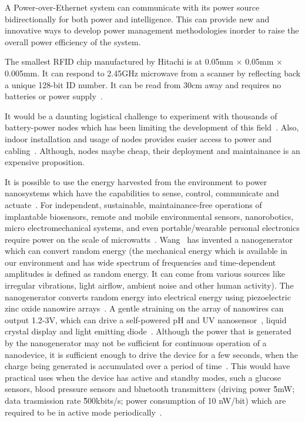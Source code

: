 \documentclass[final]{siamltex}
\begin{document}
A Power-over-Ethernet system can communicate with its power source
bidirectionally for both power and intelligence. This can provide new and
innovative ways to develop power management methodologies inorder to raise the
overall power efficiency of the system.

%
%

The smallest RFID chip manufactured by Hitachi is at 0.05mm $\times$ 0.05mm
$\times$ 0.005mm. It can respond to 2.45GHz microwave from a scanner by
reflecting back a unique 128-bit ID number. It can be read from 30cm away and
requires no batteries or power supply~\cite{hornyak2008rfid}.

It would be a daunting logistical challenge to experiment with thousands of
battery-power nodes which has been limiting the development of this
field~\cite{gluhak2011survey}. Also, indoor installation and usage of nodes
provides easier access to power and cabling~\cite{gluhak2011survey}. Although,
nodes maybe cheap, their deployment and maintainance is an expensive
proposition.

It is possible to use the energy harvested from the environment to power
nanosystems which have the capabilities to sense, control, communicate and
actuate~\cite{wang2010toward}. For independent, sustainable,
maintainance-free operations of implantable biosensors, remote and mobile
environmental sensors, nanorobotics, micro electromechanical systems, and even
portable/wearable personal electronics require power on the scale of
microwatts~\cite{wang2010toward}. Wang~\cite{wang2010toward} has invented a
nanogenerator which can convert random energy (the mechanical energy which is
available in our environment and has wide spectrum of frequencies and
time-dependent amplitudes is defined as random energy. It can come from various
sources like irregular vibrations, light airflow, ambient noise and other human
activity). The nanogenerator converts random energy into electrical energy using
piezoelectric zinc oxide nanowire
arrays~\cite{wang2006piezoelectric}\cite{yang2009converting}. A gentle straining
on the array of nanowires can output 1.2-3V, which can drive a self-powered pH
and UV nanosensor~\cite{xu2010self}, liquid crystal display and light emitting
diode~\cite{xu2010piezoelectric}\cite{zhu2010flexible}. Although the power that
is generated by the nanogenerator may not be sufficient for continuous operation
of a nanodevice, it is sufficient enough to drive the device for a few seconds,
when the charge being generated is accumulated over a period of
time~\cite{wang2010toward}. This would have practical uses when the device has
active and standby modes, such a glucose sensors, blood pressure sensors and
bluetooth transmitters (driving power \~5mW; data trasmission rate \~500kbits/s;
power consumption of 10 nW/bit) which are required to be in active mode
periodically~\cite{wang2010toward}.
\end{document}

